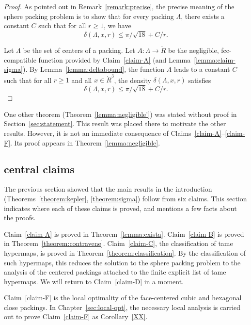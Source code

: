 \begin{proof} As pointed out in Remark~\ref{remark:precise}, the precise
meaning of the sphere packing problem is to show that for every %
packing
$\Lambda$, there exists a constant $C$ such that for all $r\ge 1$,
we have
    $$\delta(\Lambda,x,r)\le\pi/\sqrt{18} + C/r.$$

Let $\Lambda$ be the set of centers of a %
packing.  Let
$A:\Lambda \to \ring{R}$ be the negligible, fcc-compatible
function provided by Claim~\ref{claim-A} (and
Lemma~\ref{lemma:claim-sigma}). By Lemma~\ref{lemma:deltabound},
the function $A$ leads to a constant $C$ such that for all $r\ge
1$ and all $x\in \ring{R}^3$, the density $\delta(\Lambda,x,r)$
satisfies
   $$\delta(\Lambda,x,r) \le \pi/\sqrt{18} + C/r.$$
\end{proof}

\begin{remark}
One other theorem (Theorem~\ref{lemma:negligible'}) was stated
without proof in Section~\ref{sec:statement}.  This result was
placed there to motivate the other results.  However, it is not an
immediate consequence of Claims~\ref{claim-A}--\ref{claim-F}.  Its
proof appears in Theorem~\ref{lemma:negligible}.
\end{remark}

\subsection{central claims}

The previous section showed that the main results in the
introduction (Theorems~\ref{theorem:kepler}, \ref{theorem:sigma})
follow from six claims. This section indicates where each of these
claims is proved, and mentions a few facts about the proofs.

Claim~\ref{claim-A} is proved in Theorem~\ref{lemma:exista}.
Claim~\ref{claim-B} is proved in Theorem~\ref{theorem:contravene}.
Claim~\ref{claim-C}, the classification of tame hypermaps, is
proved in Theorem~\ref{theorem:classification}. By the
classification of such hypermaps, this reduces the solution to the
sphere packing problem to the analysis of the centered packings
attached to the finite explicit list of tame hypermaps.  We will
return to Claim~\ref{claim-D} in a moment.

Claim~\ref{claim-F} is the local optimality of the face-centered
cubic and hexagonal close packings.   In
Chapter~\ref{sec:local-opt}, the necessary local analysis is carried
out to prove Claim~\ref{claim-F} as
Corollary~\ref{XX}.

